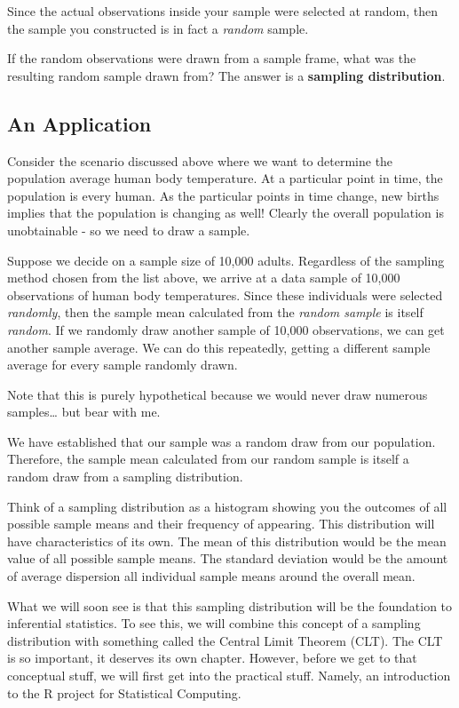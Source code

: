\documentclass[
]{book}
\begin{document}
Since the actual observations inside your sample were selected at random, then the sample you constructed is in fact a \emph{random} sample.

If the random observations were drawn from a sample frame, what was the resulting random sample drawn from? The answer is a \textbf{sampling distribution}.

\hypertarget{an-application}{%
\subsection{An Application}\label{an-application}}

Consider the scenario discussed above where we want to determine the population average human body temperature. At a particular point in time, the population is every human. As the particular points in time change, new births implies that the population is changing as well! Clearly the overall population is unobtainable - so we need to draw a sample.

Suppose we decide on a sample size of 10,000 adults. Regardless of the sampling method chosen from the list above, we arrive at a data sample of 10,000 observations of human body temperatures. Since these individuals were selected \emph{randomly}, then the sample mean calculated from the \emph{random sample} is itself \emph{random}. If we randomly draw another sample of 10,000 observations, we can get another sample average. We can do this repeatedly, getting a different sample average for every sample randomly drawn.

Note that this is purely hypothetical because we would never draw numerous samples\ldots{} but bear with me.

We have established that our sample was a random draw from our population. Therefore, the sample mean calculated from our random sample is itself a random draw from a sampling distribution.

Think of a sampling distribution as a histogram showing you the outcomes of all possible sample means and their frequency of appearing. This distribution will have characteristics of its own. The mean of this distribution would be the mean value of all possible sample means. The standard deviation would be the amount of average dispersion all individual sample means around the overall mean.

What we will soon see is that this sampling distribution will be the foundation to inferential statistics. To see this, we will combine this concept of a sampling distribution with something called the Central Limit Theorem (CLT). The CLT is so important, it deserves its own chapter. However, before we get to that conceptual stuff, we will first get into the practical stuff. Namely, an introduction to the R project for Statistical Computing.
\end{document}
